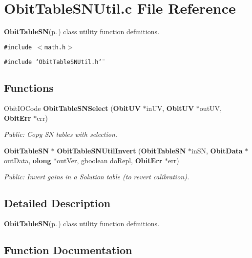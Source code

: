 \section{Obit\-Table\-SNUtil.c File Reference}
\label{ObitTableSNUtil_8c}
{\bf Obit\-Table\-SN}{\rm (p.\,\pageref{structObitTableSN})} class utility function definitions. 

{\tt \#include $<$math.h$>$}\par
{\tt \#include \char`\"{}Obit\-Table\-SNUtil.h\char`\"{}}\par
\subsection*{Functions}
\begin{CompactItemize}
\item 
Obit\-IOCode {\bf Obit\-Table\-SNSelect} ({\bf Obit\-UV} $\ast$in\-UV, {\bf Obit\-UV} $\ast$out\-UV, {\bf Obit\-Err} $\ast$err)
\begin{CompactList}\small\item\em Public: Copy SN tables with selection. \item\end{CompactList}\item 
{\bf Obit\-Table\-SN} $\ast$ {\bf Obit\-Table\-SNUtil\-Invert} ({\bf Obit\-Table\-SN} $\ast$in\-SN, {\bf Obit\-Data} $\ast$out\-Data, {\bf olong} $\ast$out\-Ver, gboolean do\-Repl, {\bf Obit\-Err} $\ast$err)
\begin{CompactList}\small\item\em Public: Invert gains in a Solution table (to revert calibration). \item\end{CompactList}\end{CompactItemize}


\subsection{Detailed Description}
{\bf Obit\-Table\-SN}{\rm (p.\,\pageref{structObitTableSN})} class utility function definitions. 



\subsection{Function Documentation}
